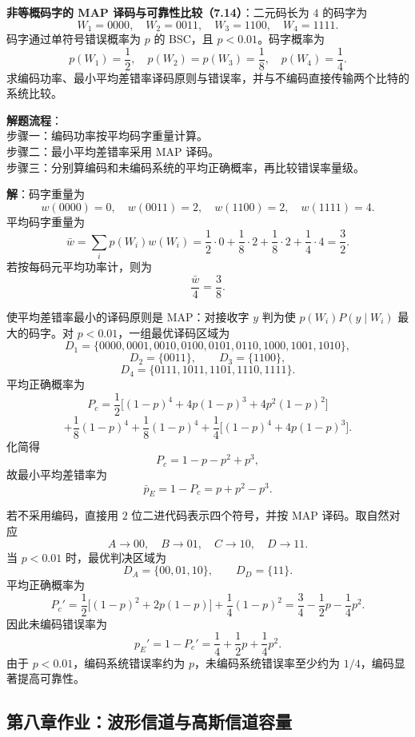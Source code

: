 \begin{example}
\label{hw:ch7-14-nonuniform-map-reliability}
\textbf{非等概码字的 MAP 译码与可靠性比较（7.14）}：二元码长为 $4$ 的码字为
\[
W_1=0000,
\quad W_2=0011,
\quad W_3=1100,
\quad W_4=1111.
\]
码字通过单符号错误概率为 $p$ 的 BSC，且 $p<0.01$。码字概率为
\[
p(W_1)=\frac12,
\quad p(W_2)=p(W_3)=\frac18,
\quad p(W_4)=\frac14.
\]
求编码功率、最小平均差错率译码原则与错误率，并与不编码直接传输两个比特的系统比较。

\noindent \textbf{解题流程}：\\[2pt]
步骤一：编码功率按平均码字重量计算。\\
步骤二：最小平均差错率采用 MAP 译码。\\
步骤三：分别算编码和未编码系统的平均正确概率，再比较错误率量级。

\textbf{解}：码字重量为
\[
w(0000)=0,
\quad w(0011)=2,
\quad w(1100)=2,
\quad w(1111)=4.
\]
平均码字重量为
\[
\bar w=\sum_i p(W_i)w(W_i)
=\frac12\cdot0+\frac18\cdot2+\frac18\cdot2+\frac14\cdot4=\frac32.
\]
若按每码元平均功率计，则为
\[
\frac{\bar w}{4}=\frac38.
\]

使平均差错率最小的译码原则是 MAP：对接收字 $y$ 判为使 $p(W_i)P(y\mid W_i)$ 最大的码字。对 $p<0.01$，一组最优译码区域为
\[
D_1=\{0000,0001,0010,0100,0101,0110,1000,1001,1010\},
\]
\[
D_2=\{0011\},
\qquad
D_3=\{1100\},
\]
\[
D_4=\{0111,1011,1101,1110,1111\}.
\]
平均正确概率为
\[
P_c=\frac12\bigl[(1-p)^4+4p(1-p)^3+4p^2(1-p)^2\bigr]
\]
\[
+\frac18(1-p)^4+\frac18(1-p)^4
+\frac14\bigl[(1-p)^4+4p(1-p)^3\bigr].
\]
化简得
\[
P_c=1-p-p^2+p^3,
\]
故最小平均差错率为
\[
\bar p_E=1-P_c=p+p^2-p^3.
\]

若不采用编码，直接用 $2$ 位二进代码表示四个符号，并按 MAP 译码。取自然对应
\[
A\to00,
\quad B\to01,
\quad C\to10,
\quad D\to11.
\]
当 $p<0.01$ 时，最优判决区域为
\[
D_A=\{00,01,10\},
\qquad
D_D=\{11\}.
\]
平均正确概率为
\[
P_c'=\frac12\bigl[(1-p)^2+2p(1-p)\bigr]+\frac14(1-p)^2
=\frac34-\frac12p-\frac14p^2.
\]
因此未编码错误率为
\[
p_E'=1-P_c'=\frac14+\frac12p+\frac14p^2.
\]
由于 $p<0.01$，编码系统错误率约为 $p$，未编码系统错误率至少约为 $1/4$，编码显著提高可靠性。
\end{example}

\subsection{第八章作业：波形信道与高斯信道容量}

